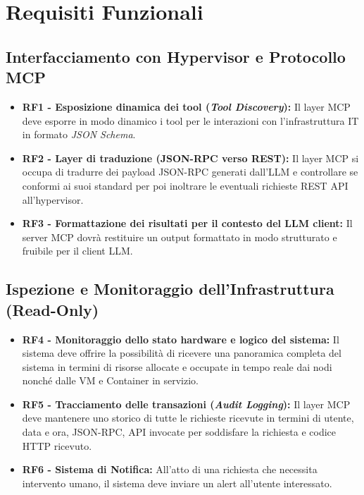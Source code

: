 \section{Requisiti Funzionali}
\subsection{Interfacciamento con Hypervisor e Protocollo MCP}
\begin{itemize}
    \item \textbf{RF1 - Esposizione dinamica dei tool (\textit{Tool Discovery}):} Il layer MCP deve esporre in modo dinamico i tool per le interazioni con l'infrastruttura IT in formato \textit{JSON Schema}.
    
    \item \textbf{RF2 - Layer di traduzione (JSON-RPC verso REST):} Il layer MCP si occupa di tradurre dei payload JSON-RPC generati dall'LLM e controllare se conformi ai suoi standard per poi inoltrare le eventuali richieste REST API all'hypervisor.
    
    \item \textbf{RF3 - Formattazione dei risultati per il contesto del LLM client:} Il server MCP dovrà restituire un output formattato in modo strutturato e fruibile per il client LLM.
\end{itemize}

\subsection{Ispezione e Monitoraggio dell'Infrastruttura (Read-Only)}
\begin{itemize}
    \item \textbf{RF4 - Monitoraggio dello stato hardware e logico del sistema:} Il sistema deve offrire la possibilità di ricevere una panoramica completa del sistema in termini di risorse allocate e occupate in tempo reale dai nodi nonché dalle VM e Container in servizio.
    
    \item \textbf{RF5 - Tracciamento delle transazioni (\textit{Audit Logging}):} Il layer MCP deve mantenere uno storico di tutte le richieste ricevute in termini di utente, data e ora, JSON-RPC, API invocate per soddisfare la richiesta e codice HTTP ricevuto.
    
    \item \textbf{RF6 - Sistema di Notifica:} All'atto di una richiesta che necessita intervento umano, il sistema deve inviare un alert all'utente interessato.
\end{itemize}

